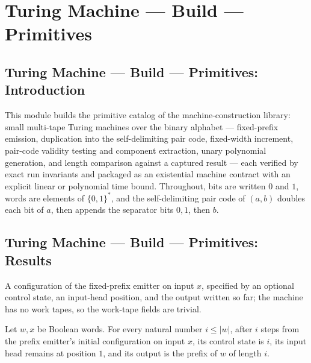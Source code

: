 \section{Turing Machine --- Build --- Primitives}
\subsection*{Turing Machine --- Build --- Primitives: Introduction}

This module builds the primitive catalog of the machine-construction library:
small multi-tape Turing machines over the binary alphabet --- fixed-prefix
emission, duplication into the self-delimiting pair code, fixed-width
increment, pair-code validity testing and component extraction, unary
polynomial generation, and length comparison against a captured result ---
each verified by exact run invariants and packaged as an existential machine
contract with an explicit linear or polynomial time bound. Throughout, bits
are written $0$ and $1$, words are elements of $\{0,1\}^*$, and the
self-delimiting pair code of $(a,b)$ doubles each bit of $a$, then appends the
separator bits $0,1$, then $b$.

\subsection*{Turing Machine --- Build --- Primitives: Results}

\begin{definition}
\label{Turing.FinTM.catalogPrefixCfg}
\leanok
{}
A configuration of the fixed-prefix emitter on input $x$, specified by an
optional control state, an input-head position, and the output written so far;
the machine has no work tapes, so the work-tape fields are trivial.
\end{definition}

\begin{lemma}
\label{Turing.FinTM.catalogPrefixTM_emit}
\leanok
{}
Let $w,x$ be Boolean words. For every natural number $i\le |w|$, after $i$ steps from
the prefix emitter's initial configuration on input $x$, its control state is $i$, its
input head remains at position $1$, and its output is the prefix of $w$ of length $i$.
\end{lemma}

